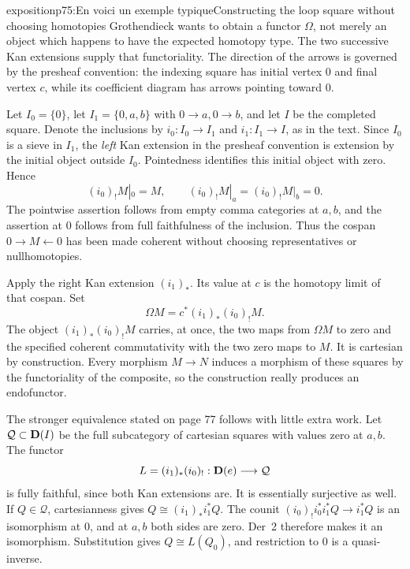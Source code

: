 \begin{dcomment}{exposition}{p75:En voici un exemple typique}{Constructing the loop square without choosing homotopies}
Grothendieck wants to obtain a functor \(\Omega\), not merely an object which happens to have the expected homotopy type. The two successive Kan extensions supply that functoriality. The direction of the arrows is governed by the presheaf convention: the indexing square has initial vertex \(0\) and final vertex \(c\), while its coefficient diagram has arrows pointing toward \(0\).

Let \(I_0=\{0\}\), let \(I_1=\{0,a,b\}\) with \(0\to a,0\to b\), and let \(I\) be the completed square. Denote the inclusions by \(i_0:I_0\to I_1\) and \(i_1:I_1\to I\), as in the text. Since \(I_0\) is a sieve in \(I_1\), the \emph{left} Kan extension in the presheaf convention is extension by the initial object outside \(I_0\). Pointedness identifies this initial object with zero. Hence
\[
 (i_0)_!M|_0=M,\qquad
 (i_0)_!M|_a=(i_0)_!M|_b=0.
\]
The pointwise assertion follows from empty comma categories at \(a,b\), and the assertion at \(0\) follows from full faithfulness of the inclusion. Thus the cospan \(0\to M\leftarrow0\) has been made coherent without choosing representatives or nullhomotopies.

Apply the right Kan extension \((i_1)_*\). Its value at \(c\) is the homotopy limit of that cospan. Set
\[
 \Omega M=c^*(i_1)_*(i_0)_!M.
\]
The object \((i_1)_*(i_0)_!M\) carries, at once, the two maps from \(\Omega M\) to zero and the specified coherent commutativity with the two zero maps to \(M\). It is cartesian by construction. Every morphism \(M\to N\) induces a morphism of these squares by the functoriality of the composite, so the construction really produces an endofunctor.

The stronger equivalence stated on page 77 follows with little extra work. Let \(\mathcal Q\subset\mathbf{D}(I)\) be the full subcategory of cartesian squares with values zero at \(a,b\). The functor
\[
 L=(i_1)_*(i_0)_!:\mathbf{D}(e)\longrightarrow\mathcal Q
\]
is fully faithful, since both Kan extensions are. It is essentially surjective as well. If \(Q\in\mathcal Q\), cartesianness gives \(Q\cong(i_1)_*i_1^*Q\). The counit
\((i_0)_!i_0^*i_1^*Q\to i_1^*Q\) is an isomorphism at \(0\), and at \(a,b\) both sides are zero. Der~2 therefore makes it an isomorphism. Substitution gives \(Q\cong L(Q_0)\), and restriction to \(0\) is a quasi-inverse.


\end{dcomment}
